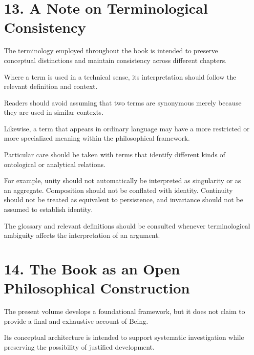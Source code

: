 
\section*{13. A Note on Terminological Consistency}

The terminology employed throughout
the book is intended to preserve
conceptual distinctions and maintain
consistency across different chapters.

Where a term is used in a technical
sense, its interpretation should follow
the relevant definition and context.

Readers should avoid assuming that
two terms are synonymous merely
because they are used in similar
contexts.

Likewise, a term that appears in
ordinary language may have a more
restricted or more specialized meaning
within the philosophical framework.

Particular care should be taken with
terms that identify different kinds
of ontological or analytical relations.

For example, unity should not automatically
be interpreted as singularity or as
an aggregate. Composition should not
be conflated with identity. Continuity
should not be treated as equivalent
to persistence, and invariance should
not be assumed to establish identity.

The glossary and relevant definitions
should be consulted whenever
terminological ambiguity affects
the interpretation of an argument.


\section*{14. The Book as an Open Philosophical
Construction}

The present volume develops a foundational
framework, but it does not claim to
provide a final and exhaustive account
of Being.

Its conceptual architecture is intended
to support systematic investigation
while preserving the possibility of
justified development.

